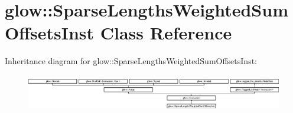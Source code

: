 \hypertarget{classglow_1_1_sparse_lengths_weighted_sum_offsets_inst}{}\section{glow\+:\+:Sparse\+Lengths\+Weighted\+Sum\+Offsets\+Inst Class Reference}
\label{classglow_1_1_sparse_lengths_weighted_sum_offsets_inst}
Inheritance diagram for glow\+:\+:Sparse\+Lengths\+Weighted\+Sum\+Offsets\+Inst\+:\begin{figure}[H]
\begin{center}
\leavevmode
\includegraphics[height=1.653136cm]{classglow_1_1_sparse_lengths_weighted_sum_offsets_inst}
\end{center}
\end{figure}
